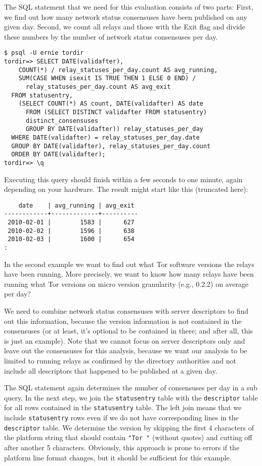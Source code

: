 \documentclass{article}
\begin{document}
The SQL statement that we need for this evaluation consists of two parts:
First, we find out how many network status consensuses have been published
on any given day.
Second, we count all relays and those with the Exit flag and divide these
numbers by the number of network status consensuses per day.

\begin{verbatim}
$ psql -U ernie tordir
tordir=> SELECT DATE(validafter),
    COUNT(*) / relay_statuses_per_day.count AS avg_running,
    SUM(CASE WHEN isexit IS TRUE THEN 1 ELSE 0 END) /
      relay_statuses_per_day.count AS avg_exit
  FROM statusentry,
    (SELECT COUNT(*) AS count, DATE(validafter) AS date
      FROM (SELECT DISTINCT validafter FROM statusentry)
      distinct_consensuses
      GROUP BY DATE(validafter)) relay_statuses_per_day
  WHERE DATE(validafter) = relay_statuses_per_day.date
  GROUP BY DATE(validafter), relay_statuses_per_day.count
  ORDER BY DATE(validafter);
tordir=> \q
\end{verbatim}

Executing this query should finish within a few seconds to one minute,
again depending on your hardware.
The result might start like this (truncated here):

\begin{verbatim}
    date    | avg_running | avg_exit
------------+-------------+----------
 2010-02-01 |        1583 |      627
 2010-02-02 |        1596 |      638
 2010-02-03 |        1600 |      654
:
\end{verbatim}

In the second example we want to find out what Tor software versions the
relays have been running.
More precisely, we want to know how many relays have been running what Tor
versions on micro version granularity (e.g., 0.2.2) on average per day?

We need to combine network status consensuses with server descriptors to
find out this information, because the version information is not
contained in the consensuses (or at least, it's optional to be contained
in there; and after all, this is just an example).
Note that we cannot focus on server descriptors only and leave out the
consensuses for this analysis, because we want our analysis to be limited
to running relays as confirmed by the directory authorities and not
include all descriptors that happened to be published at a given day.

The SQL statement again determines the number of consensuses per day in a
sub query.
In the next step, we join the \verb+statusentry+ table with the
\verb+descriptor+ table for all rows contained in the \verb+statusentry+
table.
The left join means that we include \verb+statusentry+ rows even if we do
not have corresponding lines in the \verb+descriptor+ table.
We determine the version by skipping the first 4 characters of the platform
string that should contain \verb+"Tor "+ (without quotes) and cutting off
after another 5 characters.
Obviously, this approach is prone to errors if the platform line format
changes, but it should be sufficient for this example.
\end{document}

